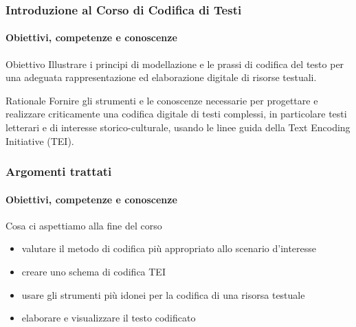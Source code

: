 
\begin{frame}
    \frametitle{Introduzione al Corso di Codifica di Testi}
    \framesubtitle{Obiettivi, competenze e conoscenze}
    \addtocounter{nframe}{1}
    
    \begin{block}{Obiettivo}
        Illustrare i principi di modellazione e le prassi di codifica del testo per una adeguata rappresentazione ed elaborazione digitale di risorse testuali.  
    \end{block}

    \begin{block}{Rationale}
       Fornire gli strumenti e le conoscenze necessarie per progettare e realizzare criticamente una codifica digitale di testi complessi, in particolare testi letterari e di interesse storico-culturale, usando le linee guida della Text Encoding Initiative (TEI).
    \end{block}

\end{frame}

\begin{frame}
    \frametitle{Argomenti trattati}
    \framesubtitle{Obiettivi, competenze e conoscenze}
    \addtocounter{nframe}{1}
    
    \begin{block}{Cosa ci aspettiamo alla fine del corso}
        \begin{itemize}
        \item valutare il metodo di codifica più appropriato allo scenario d'interesse
        \item creare uno schema di codifica TEI
        \item usare gli strumenti più idonei per la codifica di una risorsa testuale
        \item elaborare e visualizzare il testo codificato
        \end{itemize}
    \end{block}

\end{frame}

